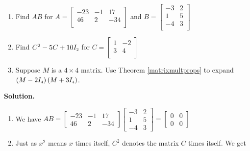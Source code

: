 \begin{ex} \label{matrixmultex}  $~$

\begin{enumerate}

\item  Find $AB$ for $A = \left[ \begin{array}{rrr} -23 & -1 & 17 \\ 46 & 2 & -34 \\ \end{array} \right]$ and $B = \left[ \begin{array}{rr} -3 & 2 \\ 1 & 5 \\ -4 & 3 \\ \end{array} \right]$


\item  Find $C^2 -5C + 10I_{\mbox{\tiny$2$}}$ for $C = \left[ \begin{array}{rr} 1 & -2 \\ 3 & 4 \\ \end{array} \right]$

\item  Suppose $M$ is a $4 \times 4$ matrix.  Use Theorem \ref{matrixmultprops} to expand $\left(M - 2I_{\mbox{\tiny$4$}}\right)\left(M + 3I_{\mbox{\tiny$4$}}\right)$.


\end{enumerate}

{\bf Solution.}  

\begin{enumerate}

\item  We have $AB = \left[ \begin{array}{rrr} -23 & -1 & 17 \\ 46 & 2 & -34  \end{array} \right] \left[ \begin{array}{rr} -3 & 2 \\ 1 & 5 \\ -4 & 3  \end{array} \right] =  \left[ \begin{array}{rr} 0 & 0 \\ 0 & 0  \end{array} \right] $


\item Just as $x^2$ means $x$ times itself, $C^2$ denotes the matrix $C$ times itself.  We get


\end{enumerate}
\end{ex}
